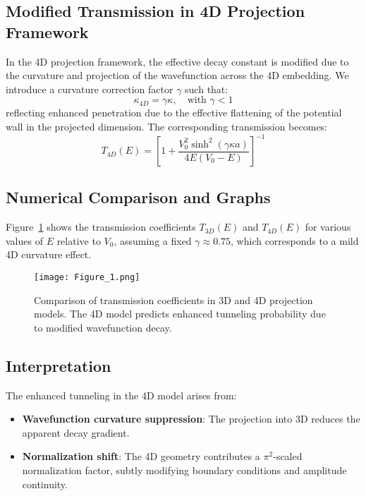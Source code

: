 \documentclass[12pt,a4paper]{article}
\begin{document}
\subsection{Modified Transmission in 4D Projection Framework}

In the 4D projection framework, the effective decay constant is modified due to the curvature and projection of the wavefunction across the 4D embedding. We introduce a curvature correction factor \(\gamma\) such that:
\begin{equation}
\kappa_{4D} = \gamma \kappa, \quad \text{with } \gamma < 1
\end{equation}
reflecting enhanced penetration due to the effective flattening of the potential wall in the projected dimension. The corresponding transmission becomes:
\begin{equation}
T_{4D}(E) = \left[ 1 + \frac{V_0^2 \sinh^2(\gamma \kappa a)}{4E(V_0 - E)} \right]^{-1}
\end{equation}

\subsection{Numerical Comparison and Graphs}

Figure~\ref{fig:tunneling-comparison} shows the transmission coefficients \(T_{3D}(E)\) and \(T_{4D}(E)\) for various values of \(E\) relative to \(V_0\), assuming a fixed \(\gamma \approx 0.75\), which corresponds to a mild 4D curvature effect.

\begin{figure}[h]
    \centering
    \texttt{[image: Figure\_1.png]}
    \caption{Comparison of transmission coefficients in 3D and 4D projection models. The 4D model predicts enhanced tunneling probability due to modified wavefunction decay.}
    \label{fig:tunneling-comparison}
\end{figure}

\subsection{Interpretation}

The enhanced tunneling in the 4D model arises from:
\begin{itemize}
    \item \textbf{Wavefunction curvature suppression}: The projection into 3D reduces the apparent decay gradient.
    \item \textbf{Normalization shift}: The 4D geometry contributes a \(\pi^2\)-scaled normalization factor, subtly modifying boundary conditions and amplitude continuity.
\end{itemize}
\end{document}

